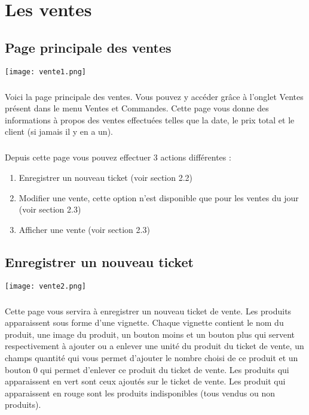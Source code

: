 \chapter{Les ventes}

\section{Page principale des ventes}

\texttt{[image: vente1.png]}

\paragraph{} Voici la page principale des ventes. Vous pouvez y accéder grâce à
l'onglet Ventes présent dans le menu Ventes et Commandes. Cette page vous donne
des informations à propos des ventes effectuées telles que la date, le prix
total et le client (si jamais il y en a un).

\paragraph{} Depuis cette page vous pouvez effectuer 3 actions différentes :
\begin{enumerate} 
    \item Enregistrer un nouveau ticket (voir section 2.2) 
    \item Modifier une vente, cette option n'est disponible que pour les ventes
    du jour (voir section 2.3) 
    \item Afficher une vente (voir section 2.3) 
\end{enumerate}

\section{Enregistrer un nouveau ticket}

\texttt{[image: vente2.png]}

\paragraph{} Cette page vous servira à enregistrer un nouveau ticket de vente.
Les produits apparaissent sous forme d'une vignette. Chaque vignette contient
le nom du produit, une image du produit, un bouton moins et un bouton plus qui
servent respectivement à ajouter ou a enlever une unité du produit du ticket de
vente, un champs quantité qui vous permet d'ajouter le nombre choisi de ce
produit et un bouton 0 qui permet d'enlever ce produit du ticket de vente. Les
produits qui apparaissent en vert sont ceux ajoutés sur le ticket de vente. Les
produit qui apparaissent en rouge sont les produits indisponibles (tous vendus
ou non produits).

